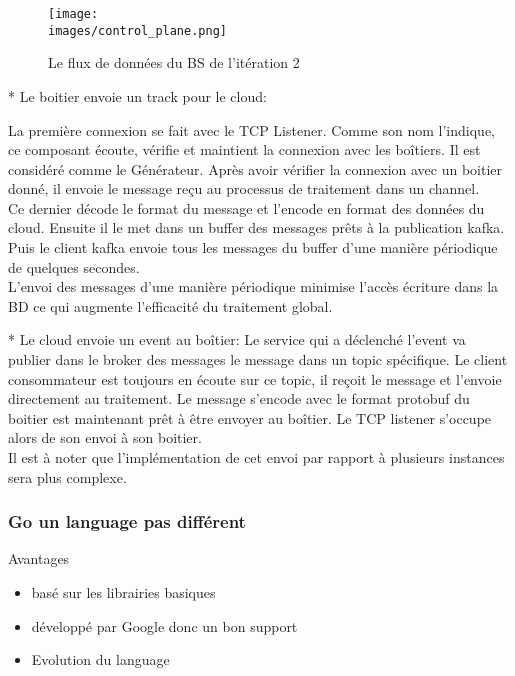              \begin{figure}[ht]
                \centering
                \texttt{[image: \\images/control\_plane.png]}
                \caption{Le flux de données du BS de l'itération 2}
                \label{Figure }
            \end{figure}


            * Le boitier envoie un track pour le cloud: 


            La première connexion se fait avec le TCP Listener. 
            Comme son nom l’indique, ce composant écoute, vérifie et  maintient la 
            connexion avec les boîtiers. Il est considéré comme le Générateur. 
            Après avoir vérifier la connexion avec un boitier donné, il envoie le 
            message reçu au processus de traitement dans un channel. \\
            Ce dernier décode le format du message et l’encode en format des données du 
            cloud. Ensuite il le met dans un buffer des messages prêts à la publication 
            kafka. Puis le client kafka envoie tous les messages du buffer d’une manière 
            périodique de quelques secondes.\\ 
            L’envoi des messages d’une manière périodique minimise l'accès 
            écriture dans la BD ce qui augmente l’efficacité du traitement global. 

            *  Le cloud envoie un event au boîtier: 
            Le service qui a déclenché l’event va publier dans le broker des messages le 
            message dans un topic spécifique. Le client consommateur est toujours en écoute sur ce topic, 
            il reçoit le message et l'envoie directement au traitement. Le message s’encode avec le format 
            protobuf du boitier est maintenant prêt à être envoyer au boîtier. Le TCP listener s’occupe alors 
            de son envoi à son boitier. \\
            Il est à noter que l'implémentation de cet envoi par rapport à plusieurs 
            instances sera plus complexe. 

        
       

        \subsubsection{Go un language pas différent}
       
       

        {Avantages}
            \begin{itemize}
                \renewcommand{\labelitemi}{$\bullet$}
                \item basé sur les librairies basiques
                \item développé par Google donc un bon support 
                \item Evolution du language
            \end{itemize}

